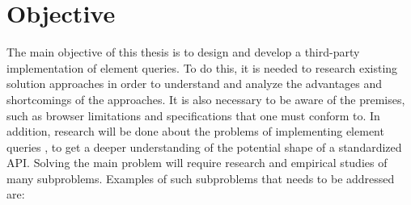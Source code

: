 \documentclass[a4paper,11pt]{kth-mag}
\begin{document}
    \section{Objective}
      The main objective of this thesis is to design and develop a \gls{third-party} implementation of element queries.
      To do this, it is needed to research existing solution approaches in order to understand and analyze the advantages and shortcomings of the approaches.
      It is also necessary to be aware of the premises, such as \gls{browser} limitations and specifications that one must conform to.
      In addition, research will be done about the problems of implementing element queries , to get a deeper understanding of the potential shape of a standardized \gls{API}.
      Solving the main problem will require research and empirical studies of many subproblems.
      Examples of such subproblems that needs to be addressed are:
\end{document}
